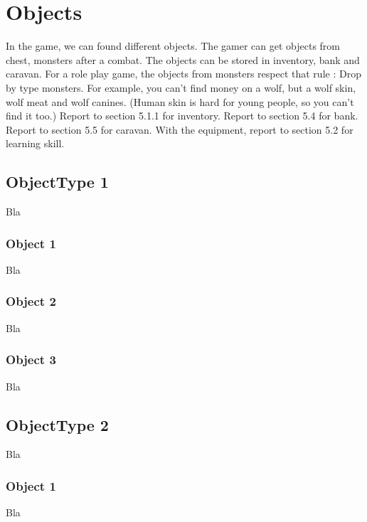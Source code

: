 \documentclass[a4paper,12pt]{book}
\begin{document}
\section{Objects}
In the game, we can found different objects. The gamer can get objects from chest, monsters after a combat. The objects can be stored in inventory, bank and caravan.
For a role play game, the objects from monsters respect that rule : Drop by type monsters. For example, you can't find money on a wolf, but a wolf skin, wolf meat and wolf canines. (Human skin is hard for young people, so you can't find it too.)
Report to section 5.1.1 for inventory.
Report to section 5.4 for bank.
Report to section 5.5 for caravan.
With the equipment, report to section 5.2 for learning skill.
\subsection{ObjectType 1}
Bla
\subsubsection{Object 1}
Bla
\subsubsection{Object 2}
Bla
\subsubsection{Object 3}
Bla
\subsection{ObjectType 2}
Bla
\subsubsection{Object 1}
Bla
\end{document}

